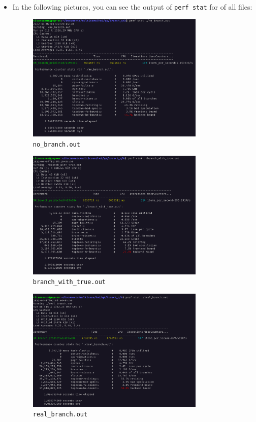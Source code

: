 \documentclass[12pt]{article}
\begin{document}
\begin{itemize}
	\item
	In the following pictures, you can see the output of \Verb+perf stat+ for of all files:
	
\begin{figure}[H]
	\centering
	\includegraphics[width=0.8\textwidth]{./images/4A/no-branch.png}	
	\cprotect\caption{\Verb+no_branch.out+}
\end{figure}



\begin{figure}[H]
	\centering
	\includegraphics[width=0.8\textwidth]{./images/4A/branch-with-true.png}	
	\cprotect\caption{\Verb+branch_with_true.out+}
\end{figure}

\begin{figure}[H]
	\centering
	\includegraphics[width=0.8\textwidth]{./images/4A/real-branch.png}	
	\cprotect\caption{\Verb+real_branch.out+}
\end{figure}


\end{itemize}
\end{document}
